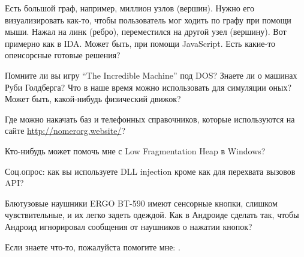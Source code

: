 \myhrule{}

Есть большой граф, например, миллион узлов (вершин).
Нужно его визуализировать как-то, чтобы пользователь мог ходить по графу при помощи мыши.
Нажал на линк (ребро), переместился на другой узел (вершину).
Вот примерно как в IDA.
Может быть, при помощи JavaScript.
Есть какие-то опенсорсные готовые решения?

\myhrule{}

Помните ли вы игру ``The Incredible Machine'' под DOS?
Знаете ли о машинах Руби Голдберга?
Что в наше время можно использовать для симуляции оных?
Может быть, какой-нибудь физический движок?

\myhrule{}

Где можно накачать баз и телефонных справочников, которые используются на сайте \url{http://nomerorg.website/}?

\myhrule{}

Кто-нибудь может помочь мне с Low Fragmentation Heap в Windows?

\myhrule{}

Соц.опрос: как вы используете DLL injection кроме как для перехвата вызовов API?

\myhrule{}

Блютузовые наушники ERGO BT-590 имеют сенсорные кнопки, слишком чувствительные, и их легко задеть одеждой.
Как в Андроиде сделать так, чтобы Андроид игнорировал сообщения от наушников о нажатии кнопок?

\myhrule{}

Если знаете что-то, пожалуйста помогите мне: \EMAILS{}.

